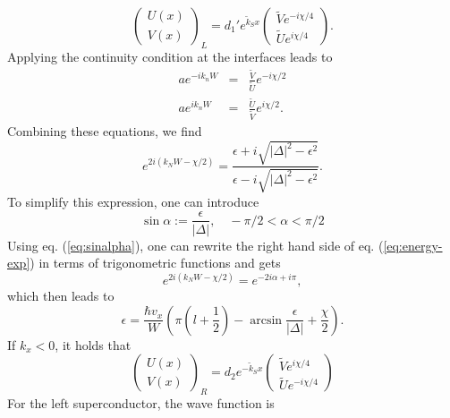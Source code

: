 \begin{equation}
\begin{pmatrix} U(x) \\ V(x) \end{pmatrix}_L = d_1' e^{ \tilde{k}_S x } \begin{pmatrix} \tilde{V} e^{-i \chi / 4}\\ \tilde{U} e^{i \chi / 4} \end{pmatrix}.
\end{equation}
Applying the continuity condition at the interfaces leads to
\begin{eqnarray}
a e^{-i k_n W} &=& \frac{\tilde{V}}{\tilde{U}} e^{-i \chi /2}  \\
a e^{i k_n W} &=& \frac{\tilde{U}}{\tilde{V}} e^{i \chi /2}.
\end{eqnarray}
Combining these equations, we find
\begin{equation}
e^{2i ( k_N W - \chi /2 )}  = \frac{\epsilon + i \sqrt{|\Delta|^2 - \epsilon^2 }}{ \epsilon - i \sqrt{|\Delta|^2 - \epsilon^2 } } \label{eq:energy-exp}.
\end{equation}
To simplify this expression, one can introduce 
\begin{equation}
\sin \alpha := \frac{\epsilon}{|\Delta|}, \quad - \pi / 2 < \alpha < \pi / 2\label{eq:sinalpha}
\end{equation}
Using eq. (\ref{eq:sinalpha}), one can rewrite the right hand side of eq. (\ref{eq:energy-exp}) in terms of trigonometric functions and gets
\begin{equation}
e^{2i ( k_N W - \chi /2 )} = e^{-2i \alpha + i \pi},
\end{equation}
which then leads to
\begin{equation}
\epsilon = \frac{\hbar v_x}{W} \left( \pi \left(l + \frac{1}{2} \right) - \arcsin \frac{\epsilon}{|\Delta|} + \frac{\chi}{2} \right).
\end{equation}
If $k_x < 0 $, it holds that
\begin{equation}
\begin{pmatrix} U(x) \\ V(x) \end{pmatrix}_R = d_2 e^{ - \tilde{k}_S x } \begin{pmatrix} \tilde{V} e^{i \chi/4} \\ \tilde{U} e^{-i \chi/4} \end{pmatrix}
\end{equation}
For the left superconductor, the wave function is
